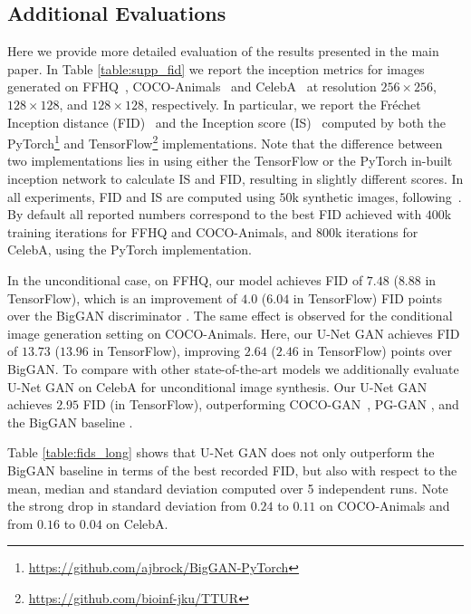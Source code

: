 \documentclass[10pt,twocolumn,letterpaper]{article}
\begin{document}
 \subsection{Additional Evaluations}\label{sec:results}
Here we provide more detailed evaluation of the results presented in the main paper. In Table \ref{table:supp_fid} we report the inception metrics for images generated on FFHQ~\cite{Karras2018ASG}, COCO-Animals~\cite{Lin2014MicrosoftCC,OpenImages} and CelebA~\cite{Liu_Celeba} at resolution $256\times 256$, $128\times 128$, and $128\times 128$, respectively. In particular,
we report the Fr{\'e}chet Inception distance (FID)~\cite{heuselttur2017} and the Inception score (IS)~\cite{SalimansNeurIPS2016} computed by both the PyTorch\footnote{\url{https://github.com/ajbrock/BigGAN-PyTorch}} and TensorFlow\footnote{\url{https://github.com/bioinf-jku/TTUR}} implementations.
Note that the difference between two implementations lies in using either the TensorFlow or the PyTorch in-built inception network to calculate IS and FID, resulting in slightly different scores.
In all experiments, FID and IS are computed using $50$\unit{k} synthetic images, following~\cite{karras2018progressive}.
By default all reported numbers correspond to the best FID achieved with $400$\unit{k} training iterations for FFHQ and COCO-Animals, and $800$\unit{k} iterations for CelebA, using the PyTorch implementation. 

In the unconditional case, on FFHQ, our model achieves FID of $7.48$ ($8.88$ in TensorFlow), which is an improvement of $4.0$ ($6.04$ in TensorFlow) FID points over the BigGAN discriminator \cite{Brock2019}. 
The same effect is observed for the conditional image generation setting on COCO-Animals. Here, our U-Net GAN achieves FID of $13.73$ ($13.96$ in TensorFlow), improving $2.64$ ($2.46$ in TensorFlow) points over BigGAN. 
To compare with other state-of-the-art models we additionally evaluate U-Net GAN on CelebA for unconditional image synthesis. Our U-Net GAN achieves $2.95$ FID (in TensorFlow), outperforming COCO-GAN~\cite{Lin2019COCOGANGB}, PG-GAN \cite{karras2018progressive}, and the BigGAN baseline \cite{Brock2019}. 

Table \ref{table:fids_long} shows that U-Net GAN does not only outperform the BigGAN baseline in terms of the best recorded FID, but also with respect to the mean, median and standard deviation computed over 5 independent runs. Note the strong drop in standard deviation from $0.24$ to $0.11$ on COCO-Animals and from $0.16$ to $0.04$ on CelebA.
\end{document}

